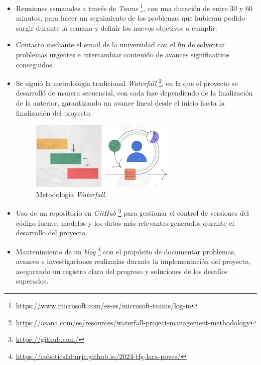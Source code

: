 \begin{itemize}
    \item Reuniones semanales a través de \textit{Teams} \footnote{\url{https://www.microsoft.com/es-es/microsoft-teams/log-in}}, con una duración de entre 30 y 60 minutos, para hacer un seguimiento de los problemas que hubieran podido surgir durante la semana y definir los nuevos objetivos a cumplir.
    \item Contacto mediante el email de la universidad con el fin de solventar problemas urgentes e intercambiar contenido de avances significativos conseguidos.
    \item Se siguió la metodología tradicional \textit{Waterfall} \footnote{\url{https://asana.com/es/resources/waterfall-project-management-methodology}}, en la que el proyecto se desarrolló de manera secuencial, con cada fase dependiendo de la finalización de la anterior, garantizando un avance lineal desde el inicio hasta la finalización del proyecto.

	\begin{figure}[ht]
	  \begin{center}
	    \includegraphics[width=7cm]{figs/objetivos/waterfall.png}
	  \end{center}
	  \caption{Metodología \textit{Waterfall}.}
	  \label{waterfall}
	\end{figure}

    \item Uso de un repositorio en \textit{GitHub}  \footnote{\url{https://github.com/}} para gestionar el control de versiones del código fuente, modelos y los datos más relevantes generados durante el desarrollo del proyecto.
    \item Mantenimiento de un \textit{blog} \footnote{\url{https://roboticslaburjc.github.io/2024-tfg-lara-poves/}} con el propósito de documentar problemas, avances e investigaciones realizadas durante la implementación del proyecto, asegurando un registro claro del progreso y soluciones de los desafíos superados.


\end{itemize}
